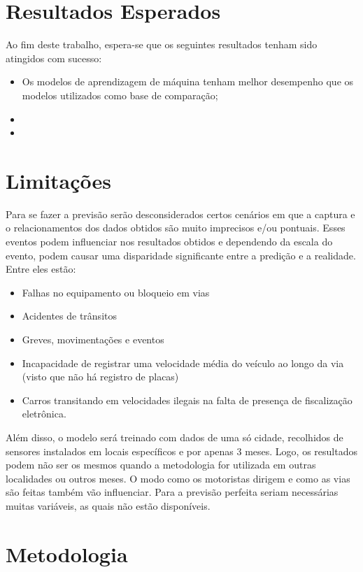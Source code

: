 \section{Resultados Esperados}

Ao fim deste trabalho, espera-se que os seguintes resultados tenham sido atingidos com sucesso:

\begin{itemize}
    \item Os modelos de aprendizagem de máquina tenham melhor desempenho que os modelos utilizados como base de comparação;
    \item 
    \item
\end{itemize}

\section{Limitações}

Para se fazer a previsão serão desconsiderados certos cenários em que a captura e o relacionamentos dos dados obtidos são muito imprecisos e/ou pontuais. Esses eventos podem influenciar nos resultados obtidos e dependendo da escala do evento, podem causar uma disparidade significante entre a predição e a realidade. Entre eles estão:

\begin{itemize}
    \item Falhas no equipamento ou bloqueio em vias
    \item Acidentes de trânsitos
    \item Greves, movimentações e eventos
    \item Incapacidade de registrar uma velocidade média do veículo ao longo da via (visto que não há registro de placas)
    \item Carros transitando em velocidades ilegais na falta de presença de fiscalização eletrônica.
\end{itemize}

Além disso, o modelo será treinado com dados de uma só cidade, recolhidos de sensores instalados em locais específicos e por apenas 3 meses. Logo, os resultados podem não ser os mesmos quando a metodologia for utilizada em outras localidades ou outros meses. O modo como os motoristas dirigem e como as vias são feitas também vão influenciar. Para a previsão perfeita seriam necessárias muitas variáveis, as quais não estão disponíveis.

\section{Metodologia}

